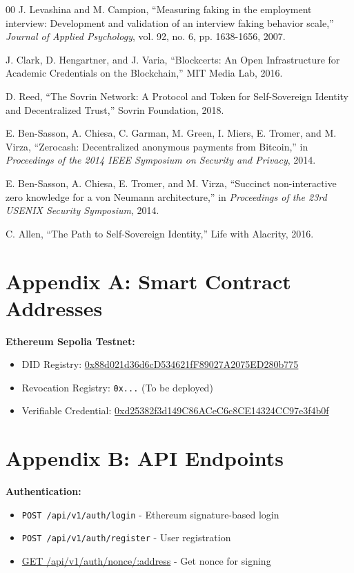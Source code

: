 \documentclass[conference]{IEEEtran}
\begin{document}

\begin{thebibliography}{00}
 J. Levashina and M. Campion, ``Measuring faking in the employment interview: Development and validation of an interview faking behavior scale,'' \textit{Journal of Applied Psychology}, vol. 92, no. 6, pp. 1638-1656, 2007.

 J. Clark, D. Hengartner, and J. Varia, ``Blockcerts: An Open Infrastructure for Academic Credentials on the Blockchain,'' MIT Media Lab, 2016.

 D. Reed, ``The Sovrin Network: A Protocol and Token for Self-Sovereign Identity and Decentralized Trust,'' Sovrin Foundation, 2018.

 E. Ben-Sasson, A. Chiesa, C. Garman, M. Green, I. Miers, E. Tromer, and M. Virza, ``Zerocash: Decentralized anonymous payments from Bitcoin,'' in \textit{Proceedings of the 2014 IEEE Symposium on Security and Privacy}, 2014.

 E. Ben-Sasson, A. Chiesa, E. Tromer, and M. Virza, ``Succinct non-interactive zero knowledge for a von Neumann architecture,'' in \textit{Proceedings of the 23rd USENIX Security Symposium}, 2014.

 C. Allen, ``The Path to Self-Sovereign Identity,'' Life with Alacrity, 2016.
\end{thebibliography}

\section*{Appendix A: Smart Contract Addresses}

\textbf{Ethereum Sepolia Testnet:}
\begin{itemize}
\item DID Registry: \url{0x88d021d36d6cD534621fF89027A2075ED280b775}
\item Revocation Registry: \texttt{0x...} (To be deployed)
\item Verifiable Credential: \url{0xd25382f3d149C86ACeC6c8CE14324CC97e3f4b0f}
\end{itemize}

\section*{Appendix B: API Endpoints}

\textbf{Authentication:}
\begin{itemize}
\item \texttt{POST /api/v1/auth/login} - Ethereum signature-based login
\item \texttt{POST /api/v1/auth/register} - User registration
\item \url{GET /api/v1/auth/nonce/:address} - Get nonce for signing
\end{itemize}
\end{document}

